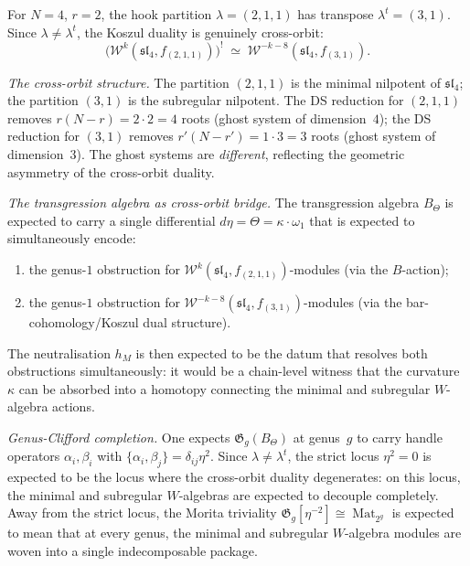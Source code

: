 \begin{conjecture}
For $N=4$, $r=2$, the hook partition $\lambda=(2,1,1)$ has
transpose $\lambda^t=(3,1)$. Since
$\lambda\neq\lambda^t$, the Koszul duality is genuinely
cross-orbit:
\[
\bigl(\mathcal W^k(\mathfrak{sl}_4,f_{(2,1,1)})\bigr)^!
\;\simeq\;
\mathcal W^{-k-8}(\mathfrak{sl}_4,f_{(3,1)}).
\]

\emph{The cross-orbit structure.}
The partition $(2,1,1)$ is the minimal nilpotent of
$\mathfrak{sl}_4$; the partition $(3,1)$ is the subregular
nilpotent. The DS reduction for $(2,1,1)$ removes
$r(N{-}r)=2\cdot 2=4$ roots (ghost system of dimension~$4$);
the DS reduction for $(3,1)$ removes
$r'(N{-}r')=1\cdot 3=3$ roots (ghost system of dimension~$3$).
The ghost systems are \emph{different}, reflecting the
geometric asymmetry of the cross-orbit duality.

\emph{The transgression algebra as cross-orbit bridge.}
The transgression algebra $B_\Theta$ is expected to carry a single
differential $d\eta=\Theta=\kappa\cdot\omega_1$ that is expected to
simultaneously encode:
\begin{enumerate}[label=\textup{(\roman*)}]
\item the genus-$1$ obstruction for
 $\mathcal W^k(\mathfrak{sl}_4,f_{(2,1,1)})$-modules
 (via the $B$-action);
\item the genus-$1$ obstruction for
 $\mathcal W^{-k-8}(\mathfrak{sl}_4,f_{(3,1)})$-modules
 (via the bar-cohomology/Koszul dual structure).
\end{enumerate}
The neutralisation $h_M$ is then expected to be the datum that resolves both
obstructions simultaneously: it would be a chain-level witness
that the curvature $\kappa$ can be absorbed into a
homotopy connecting the minimal and subregular
$W$-algebra actions.

\emph{Genus-Clifford completion.}
One expects $\mathfrak G_g(B_\Theta)$ at genus~$g$ to carry handle
operators $\alpha_i,\beta_i$ with
$\{\alpha_i,\beta_j\}=\delta_{ij}\eta^2$. Since
$\lambda\neq\lambda^t$, the strict locus $\eta^2=0$ is expected to be
the locus where the cross-orbit duality degenerates:
on this locus, the minimal and subregular $W$-algebras
are expected to decouple completely. Away from the strict locus, the
Morita triviality
$\mathfrak G_g[\eta^{-2}]\cong\operatorname{Mat}_{2^g}$
is expected to mean that at every genus, the minimal and subregular
$W$-algebra modules are woven into a single indecomposable
package.
\end{conjecture}

